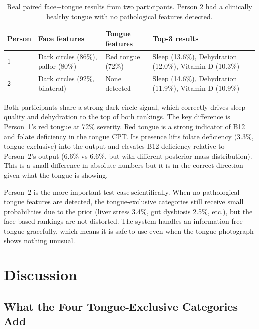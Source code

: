 \documentclass[journal]{IEEEtran}
\begin{document}
\begin{table}[h]
\centering
\caption{Real paired face+tongue results from two participants. Person 2 had a
clinically healthy tongue with no pathological features detected.}
\label{tab:cases}
\begin{tabular}{p{1.2cm}p{2.1cm}p{2.0cm}p{2.1cm}}
\toprule
\textbf{Person} & \textbf{Face features} & \textbf{Tongue features} & \textbf{Top-3 results} \\
\midrule
1 &
Dark circles (86\%), pallor (80\%) &
Red tongue (72\%) &
Sleep (13.6\%), Dehydration (12.0\%), Vitamin D (10.3\%) \\
\midrule
2 &
Dark circles (92\%, bilateral) &
None detected &
Sleep (14.6\%), Dehydration (11.9\%), Vitamin D (10.9\%) \\
\bottomrule
\end{tabular}
\end{table}

Both participants share a strong dark circle signal, which correctly drives
sleep quality and dehydration to the top of both rankings. The key difference
is Person~1's red tongue at 72\% severity. Red tongue is a strong indicator
of B12 and folate deficiency in the tongue CPT. Its presence lifts folate
deficiency (3.3\%, tongue-exclusive) into the output and elevates B12 deficiency
relative to Person~2's output (6.6\% vs 6.6\%, but with different posterior
mass distribution). This is a small difference in absolute numbers but it is
in the correct direction given what the tongue is showing.

Person~2 is the more important test case scientifically. When no pathological
tongue features are detected, the tongue-exclusive categories still receive
small probabilities due to the prior (liver stress 3.4\%, gut dysbiosis 2.5\%,
etc.), but the face-based rankings are not distorted. The system handles an
information-free tongue gracefully, which means it is safe to use even when
the tongue photograph shows nothing unusual.

\section{Discussion}
\label{sec:discussion}

\subsection{What the Four Tongue-Exclusive Categories Add}
\end{document}
